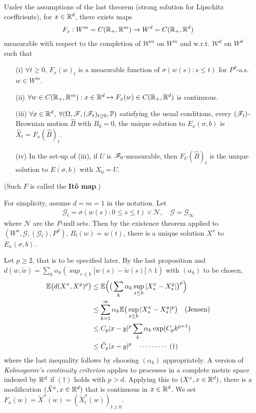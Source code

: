 \documentclass[12pt,a4paper]{article}
\newenvironment{proof}
{\begin{changemargin}{0.5cm}{0.5cm} 
	}%
	{\end{changemargin}
}
\newenvironment{p}
{\begin{proof} 
	}%
	{\end{proof}
}
\begin{document}
\thm Under the assumptions of the last theorem (strong solution for Lipschitz coefficients), for $x\in\mathbb{R}^d$, there exists maps
\begin{align*}
F_x : W^m = C(\mathbb{R}_+ , \mathbb{R}^m) \rightarrow W^d = C(\mathbb{R}_+, \mathbb{R}^d)
\end{align*}
measurable with respect to the completion of $\mathscr{W}^m$ on $W^m$ and w.r.t. $\mathscr{W}^d$ on $W^d$ such that
\begin{itemize}
\item[(i)] $\forall t\geq 0$, $F_x(w)_t$ is a measurable function of $\sigma (w(s) : s\leq t)$ for $P^d$-a.s. $w \in W^m$.
\item[(ii)] $\forall w\in C(\mathbb{R}_+, \mathbb{R}^m) : x\in \mathbb{R}^d \mapsto F_x(w) \in C(\mathbb{R}_+, \mathbb{R}^d)$ is continuous.
\item[(iii)] $\forall x\in \mathbb{R}^d$, $\forall (\Omega, \mathscr{F}, (\mathscr{F}_t)_{t\geq 0}, \mathbb{P})$ satisfying the usual conditions, every $(\mathscr{F}_t)$-Brownian motion $\hat{B}$ with $\hat{B}_0 =0$, the unique solution to $E_x(\sigma, b)$ is $\hat{X}_t = F_x(\hat{B})_t$.
\item[(iv)] In the set-up of (iii), if $U$ is $\mathscr{F}_0$-measurable, then $F_U(\hat{B})_t$ is the unique solution to $E(\sigma, b)$ with $X_0 =U$.
\end{itemize}
(Such $F$ is called the \textbf{It\^o map}.)
\begin{p}
\pf For simplicity, assume $d=m=1$ in the notation. Let
\begin{align*}
\mathscr{G}_t = \sigma(w(s) : 0\leq s\leq t) \vee \mathscr{N}, \quad \mathscr{G} = \mathscr{G}_{\infty}
\end{align*}
where $\mathscr{N}$ are the $P$-null sets. Then by the existence theorem applied to $(W^n, \mathscr{G}, (\mathscr{G}_t), P^d)$, $B_t(w) = w(t)$, there is a unique solution $X^x$ to $E_x(\sigma, b)$.

\quad Let $p\geq 2$, that is to be specified later. By the last proposition and $d(w, \tilde{w}) = \sum_{k} \alpha_k ( \sup_{s\leq k} |w(s)- \tilde{w}(s)| \wedge 1)$ with $(\alpha_k)$ to be chosen,
\begin{align*}
\mathbb{E} \big( d(X^x , X^y)^p \big) & \leq \mathbb{E} \Big( \big( \sum_k \alpha_k \sup_{s\leq k} |X_s^x - X_s^y| \big)^p \Big) \\
& \leq \sum_{k=1}^{\infty} \alpha_k \mathbb{E} \big( \sup_{s\leq k} |X_s^x - X_s^y|^p \big) \quad \text{(Jensen)} \\
& \leq C_p |x-y|^p \sum_{k} \alpha_k \exp ( C_p  k^{p+1})  \\
& \leq \tilde{C}_p |x-y|^p \quad \cdots\cdots\cdots\,\,(\dagger)
\end{align*}
where the last inequality follows by choosing $(\alpha_k)$ appropriately. A version of \emph{Kolmogorov's continuity criterion} applies to processes in a complete metric space indexed by $\mathbb{R}^d$ if $(\dagger)$ holds with $p>d$. Applying this to $(X^x, x\in \mathbb{R}^d)$, there is a modification $(\tilde{X}^x, x\in \mathbb{R}^d)$ that is continuous in $x\in \mathbb{R}^d$. We set $F_x(w) = \tilde{X}^x(w) = (\tilde{X}^x_t (w))_{t \geq 0}$.
\end{p}
\s
\end{document}
